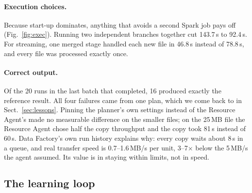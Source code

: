 \documentclass[runningheads]{llncs}
\begin{document}
\paragraph{Execution choices.} Because start-up dominates, anything that avoids a second Spark job pays
off (Fig.~\ref{fig:exec}). Running two independent branches together cut 143.7\,s to 92.4\,s. For
streaming, one merged stage handled each new file in 46.8\,s instead of 78.8\,s, and every file was
processed exactly once.

\paragraph{Correct output.} Of the 20 runs in the last batch that completed, 16 produced exactly the
reference result. All four failures came from one plan, which we come back to in
Sect.~\ref{sec:lessons}. Pinning the planner's own settings instead of the Resource Agent's made no
measurable difference on the smaller files; on the 25\,MB file the Resource Agent chose half the copy
throughput and the copy took 81\,s instead of 60\,s. Data Factory's own run history explains why: every copy
waits about 8\,s in a queue, and real transfer speed is 0.7--1.6\,MB/s per unit, 3--7$\times$ below the 5\,MB/s
the agent assumed. Its value is in staying within limits, not in speed.

\subsection{The learning loop}
\label{sec:learning}
\end{document}
